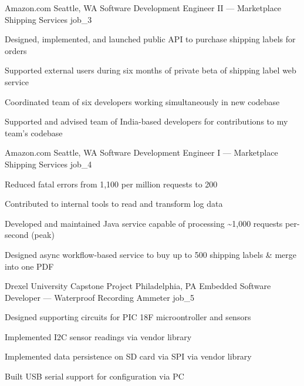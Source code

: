 \documentclass[10pt]{barag_resume}
\begin{document}
    \begin{job}{Amazon.com}
        {Seattle, WA}
        {Software Development Engineer II --- Marketplace Shipping Services}
        {job_3}
            \begin{itemize*}
                \item Designed, implemented, and launched public API to purchase shipping labels for orders
                \item Supported external users during six months of private beta of shipping label web service
                \item Coordinated team of six developers working simultaneously in new codebase
                \item Supported and advised team of India-based developers for contributions to my team's codebase
            \end{itemize*}
    \end{job}

    \begin{job}{Amazon.com}
        {Seattle, WA}
        {Software Development Engineer I --- Marketplace Shipping Services}
        {job_4}
            \begin{itemize*}
                \item Reduced fatal errors from 1,100 per million requests to 200
                \item Contributed to internal tools to read and transform log data
                \item Developed and maintained Java service capable of processing \~{}1,000 requests per-second (peak)
                \item Designed async workflow-based service to buy up to 500 shipping labels \& merge into one PDF
            \end{itemize*}
    \end{job}

    \begin{job}{Drexel University Capstone Project}
        {Philadelphia, PA}
        {Embedded Software Developer --- Waterproof Recording Ammeter}
        {job_5}
            \begin{itemize*}
                \item Designed supporting circuits for PIC 18F microontroller and sensors
                \item Implemented I2C sensor readings via vendor library
                \item Implemented data persistence on SD card via SPI via vendor library
                \item Built USB serial support for configuration via PC
            \end{itemize*}
    \end{job}
\end{document}
